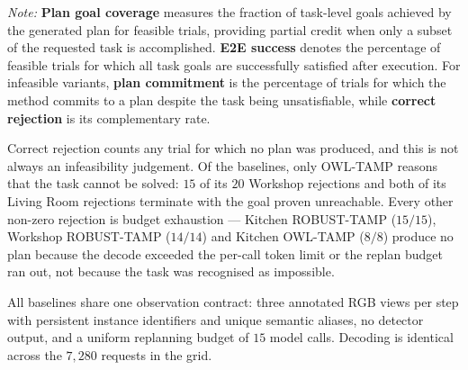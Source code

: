\begin{table}[!t]
\begin{minipage}{0.98\textwidth}
\footnotesize

\textit{Note:}
\textbf{Plan goal coverage} measures the fraction of task-level goals achieved
by the generated plan for feasible trials, providing partial credit when only a
subset of the requested task is accomplished.
\textbf{E2E success} denotes the percentage of feasible trials for which all
task goals are successfully satisfied after execution.
For infeasible variants, \textbf{plan commitment} is the percentage of trials
for which the method commits to a plan despite the task being unsatisfiable,
while \textbf{correct rejection} is its complementary rate.

Correct rejection counts any trial for which no plan was produced, and this is
not always an infeasibility judgement. Of the baselines, only OWL-TAMP reasons
that the task cannot be solved: $15$ of its $20$ Workshop rejections and both
of its Living Room rejections terminate with the goal proven unreachable. Every
other non-zero rejection is budget exhaustion --- Kitchen ROBUST-TAMP ($15/15$),
Workshop ROBUST-TAMP ($14/14$) and Kitchen OWL-TAMP ($8/8$) produce no plan
because the decode exceeded the per-call token limit or the replan budget ran
out, not because the task was recognised as impossible.

All baselines share one observation contract: three annotated RGB views per
step with persistent instance identifiers and unique semantic aliases, no
detector output, and a uniform replanning budget of $15$ model calls. Decoding
is identical across the $7{,}280$ requests in the grid.
\end{minipage}

\end{table}

